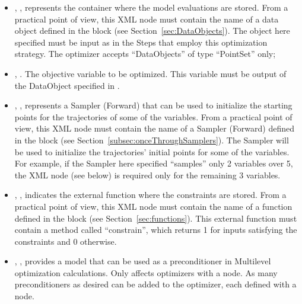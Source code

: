 \begin{itemize}
\item {}, ,
        represents the container where the model evaluations are stored.
        From a practical point of view, this XML node must contain the name of
        a data object defined in the  block (see
        Section~\ref{sec:DataObjects}). The object here specified must be
        input as   in the Steps that employ this optimization strategy.
        The  optimizer accepts ``DataObjects'' of type ``PointSet'' only;
        \item {}, . The objective variable to be optimized. This variable must be
          output of the DataObject specified in .
\item {}, ,
        represents a Sampler (Forward) that can be used to initialize the starting points for the trajectories of some of the variables.
        From a practical point of view, this XML node must contain the name of
        a Sampler (Forward) defined in the  block (see
        Section~\ref{subsec:onceThroughSamplers}). The Sampler will be used to initialize the trajectories' initial points for some
        of the variables. For example, if the Sampler here specified ``samples'' only 2 variables over 5, the   XML node (see below) is required
        only for the remaining 3 variables.
\item {}, ,
        indicates the external function where the constraints are stored. From a practical point of view, this XML node must contain the
        name of a function defined in the  block (see Section~\ref{sec:functions}). This external function must
        contain a method called ``constrain'', which returns 1 for inputs satisfying the constraints and 0 otherwise.
\item {}, ,
        provides a model that can be used as a preconditioner in Multilevel optimization
        calculations.  Only
        affects optimizers with a  node.  As many preconditioners as
        desired can be added
        to the optimizer, each defined with a  node.

\end{itemize}
